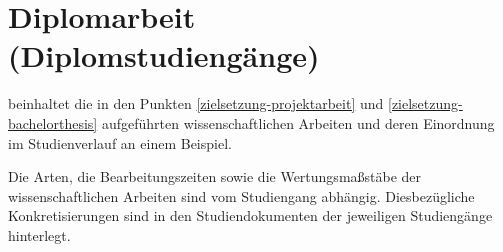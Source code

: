 \section{Diplomarbeit (Diplomstudiengänge)}
\label{zielsetzung-diplomarbeit}

 beinhaltet die in den Punkten \ref{zielsetzung-projektarbeit} und \ref{zielsetzung-bachelorthesis} aufgeführten wissenschaftlichen Arbeiten und deren Einordnung im Studienverlauf an einem Beispiel.


Die Arten, die Bearbeitungszeiten sowie die Wertungsmaßstäbe der wissenschaftlichen Arbeiten sind vom Studiengang abhängig.
Diesbezügliche Konkretisierungen sind in den Studiendokumenten der jeweiligen Studiengänge hinterlegt.
